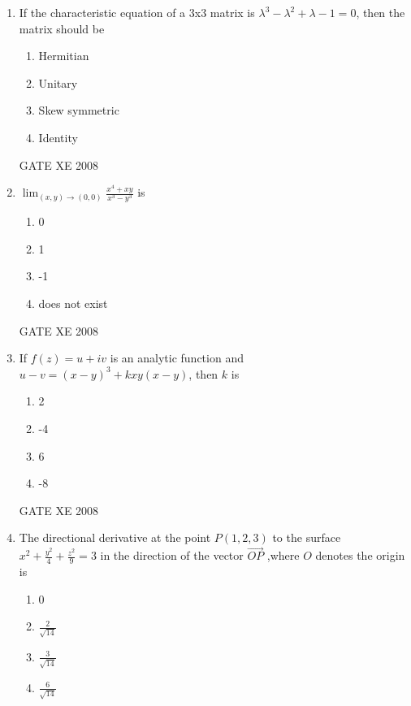\documentclass[12pt]{article}
\begin{document}
\begin{enumerate}[label=Q\arabic*.]
\item If the characteristic equation of a 3x3 matrix is $\lambda^3 - \lambda^2 + \lambda - 1 =0$, then the matrix should be 

\begin{enumerate}[label=(\Alph*)]

\item  Hermitian 
\item Unitary
 \item Skew symmetric
\item Identity

\end{enumerate}

GATE XE 2008

\item {\large $\lim_{(x,y) \to (0,0)} \frac{x^4 + xy}{x^3 - y^3} $} is

\begin{enumerate}[label=(\Alph*)]
\item 0
\item 1
\item -1
\item does not exist

\end{enumerate}
GATE XE 2008
\item If $f(z)= u + iv$ is an analytic function and $u-v=(x-y)^3 + kxy(x-y)$, then $k$ is

\begin{enumerate}[label=(\Alph*)]
\item  2
\item  -4
\item  6
\item -8
\end{enumerate}

GATE XE 2008
\item The directional derivative at the point $P(1,2,3)$ to the surface {\large $x^2 + \frac{y^2}{4} + \frac{z^2}{9} =3$} in the direction of the vector $\overrightarrow{OP}$ ,where $O$ denotes the origin is

\begin{enumerate}[label=(\Alph*)]
\item 0
\item {\Large $\frac{2}{\sqrt{14}}$}
\item {\Large $\frac{3}{\sqrt{14}}$}
\item {\Large $\frac{6}{\sqrt{14}}$}
\end{enumerate}


\end{enumerate}
\end{document}
